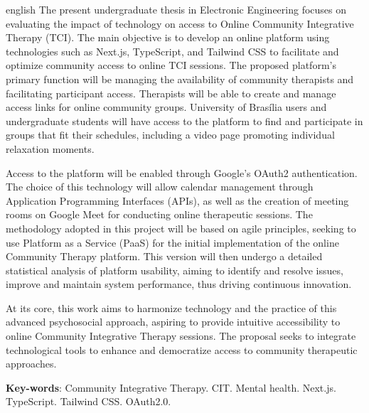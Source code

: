 \begin{resumo}[Abstract]
 \begin{otherlanguage*}{english}
    The present undergraduate thesis in Electronic Engineering focuses on evaluating the impact of technology on access to Online Community Integrative Therapy (TCI). The main objective is to develop an online platform using technologies such as Next.js, TypeScript, and Tailwind CSS to facilitate and optimize community access to online TCI sessions. The proposed platform's primary function will be managing the availability of community therapists and facilitating participant access. Therapists will be able to create and manage access links for online community groups. University of Brasília users and undergraduate students will have access to the platform to find and participate in groups that fit their schedules, including a video page promoting individual relaxation moments.

    Access to the platform will be enabled through Google's OAuth2 authentication. The choice of this technology will allow calendar management through Application Programming Interfaces (APIs), as well as the creation of meeting rooms on Google Meet for conducting online therapeutic sessions. The methodology adopted in this project will be based on agile principles, seeking to use Platform as a Service (PaaS) for the initial implementation of the online Community Therapy platform. This version will then undergo a detailed statistical analysis of platform usability, aiming to identify and resolve issues, improve and maintain system performance, thus driving continuous innovation.

    At its core, this work aims to harmonize technology and the practice of this advanced psychosocial approach, aspiring to provide intuitive accessibility to online Community Integrative Therapy sessions. The proposal seeks to integrate technological tools to enhance and democratize access to community therapeutic approaches.
   \vspace{\onelineskip}
 
   \noindent 
   \textbf{Key-words}: Community Integrative Therapy. CIT. Mental health. Next.js. TypeScript. Tailwind CSS. OAuth2.0.
 \end{otherlanguage*}
\end{resumo}
